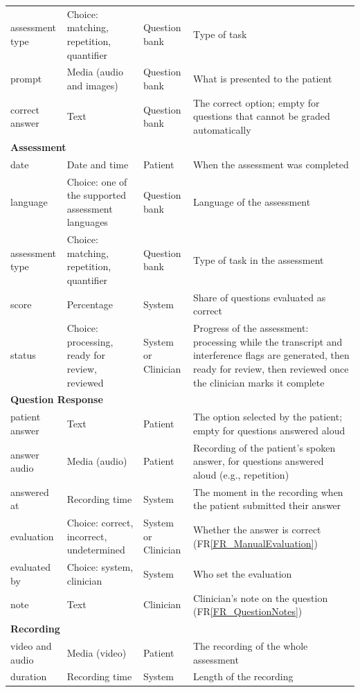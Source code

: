 \documentclass[12pt]{article}
\newcommand{\rref}[1]{FR\ref{#1}}
\begin{document}
\begin{longtable}{p{} p{} p{} p{}}
assessment type & Choice: matching, repetition, quantifier & Question bank & Type of task\\
prompt & Media (audio and images) & Question bank & What is presented to the patient\\
correct answer & Text & Question bank & The correct option; empty for questions that cannot be graded automatically\\
\midrule
\multicolumn{4}{l}{\textbf{Assessment}}\\
\midrule
date & Date and time & Patient & When the assessment was completed\\
language & Choice: one of the supported assessment languages & Question bank & Language of the assessment\\
assessment type & Choice: matching, repetition, quantifier & Question bank & Type of task in the assessment\\
score & Percentage & System & Share of questions evaluated as correct\\
status & Choice: processing, ready for review, reviewed & System or Clinician & Progress of the assessment: processing while the transcript and interference flags are generated, then ready for review, then reviewed once the clinician marks it complete\\
\midrule
\multicolumn{4}{l}{\textbf{Question Response}}\\
\midrule
patient answer & Text & Patient & The option selected by the patient; empty for questions answered aloud\\
answer audio & Media (audio) & Patient & Recording of the patient’s spoken answer, for questions answered aloud (e.g., repetition)\\
answered at & Recording time & System & The moment in the recording when the patient submitted their answer\\
evaluation & Choice: correct, incorrect, undetermined & System or Clinician & Whether the answer is correct (\rref{FR_ManualEvaluation})\\
evaluated by & Choice: system, clinician & System & Who set the evaluation\\
note & Text & Clinician & Clinician’s note on the question (\rref{FR_QuestionNotes})\\
\midrule
\multicolumn{4}{l}{\textbf{Recording}}\\
\midrule
video and audio & Media (video) & Patient & The recording of the whole assessment\\
duration & Recording time & System & Length of the recording\\

\end{longtable}
\end{document}

